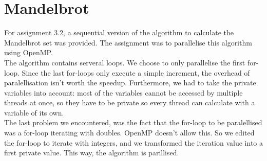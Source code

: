 \documentclass[12pt]{article}
\begin{document}
\section{Mandelbrot}
For assignment 3.2, a sequential version of the algorithm to calculate the
Mandelbrot set was provided. The assignment was to parallelise this algorithm
using OpenMP.\\
The algorithm contains serveral loops. We choose to only parallelise the first
for-loop. Since the last for-loops only execute a simple increment, the
overhead of paralellisation isn't worth the speedup. Furthermore, we had to
take the private variables into account: most of the variables cannot be
accessed by multiple threads at once, so they have to be private so every
thread can calculate with a variable of its own.\\
The last problem we encountered, was the fact that the for-loop to be
paralellised was a for-loop iterating with doubles. OpenMP doesn't allow this.
So we edited the for-loop to iterate with integers, and we transformed the
iteration value into a first private value. This way, the algorithm is
parillised.
\end{document}
